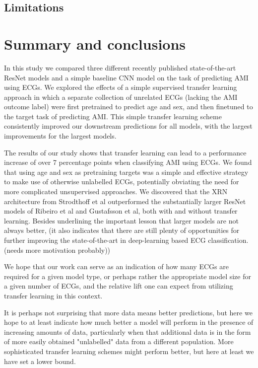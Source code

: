 \documentclass[journal,twoside,web]{ieeecolor}
\begin{document}

\subsection{Limitations}

\section{Summary and conclusions}
In this study we compared three different recently published state-of-the-art ResNet models and a simple baseline CNN model on the task of predicting AMI using ECGs. We explored the effects of a simple supervised transfer learning approach in which a separate collection of unrelated ECGs (lacking the AMI outcome label) were first pretrained to predict age and sex, and then finetuned to the target task of predicting AMI. This simple transfer learning scheme consistently improved our downstream predictions for all models, with the largest improvements for the largest models. 

The results of our study shows that transfer learning can lead to a performance increase of over 7 percentage points when classifying AMI using ECGs. We found that using age and sex as pretraining targets was a simple and effective strategy to make use of otherwise unlabelled ECGs, potentially obviating the need for more complicated unsupervised approaches. We discovered that the XRN architecture from Strodthoff et al outperformed the substantially larger ResNet models of Ribeiro et al and Gustafsson et al, both with and without transfer learning. Besides underlining the important lesson that larger models are not always better, (it also indicates that there are still plenty of opportunities for further improving the state-of-the-art in deep-learning based ECG classification. (needs more motivation probably)) 

We hope that our work can serve as an indication of how many ECGs are required for a given model type, or perhaps rather the appropriate model size for a given number of ECGs, and the relative lift one can expect from utilizing transfer learning in this context.

It is perhaps not surprising that more data means better predictions, but here we hope to at least indicate how much better a model will perform in the presence of increasing amounts of data, particularly when that additional data is in the form of more easily obtained "unlabelled" data from a different population. More sophisticated transfer learning schemes might perform better, but here at least we have set a lower bound. 
\end{document}
